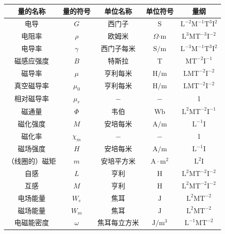 \begin{center}
\begin{tabular}{ccccc}
        \bottomrule
    \end{tabular}
        
    \newpage
    \begin{tabular}{ccccc}
        \toprule
        量的名称&量的符号&单位名称&单位符号&量纲\\
        \midrule
        电导&$G$&西门子&$\mathrm{S}$&$\mathrm{L^{-2}M^{-1}T^3I^2}$\\
        电阻率&$\rho$&欧姆米&$\Omega\mathrm{\cdot m}$&$\mathrm{L^3MT^{-3}I^{-2}}$\\
        电导率&$\gamma$&西门子每米&$\mathrm{S/m}$&$\mathrm{L^{-3}M^{-1}T^3I^2}$\\
        磁感应强度&$B$&特斯拉&$\mathrm{T}$&$\mathrm{MT^{-2}I^{-1}}$\\
        磁导率&$\mu$&亨利每米&$\mathrm{H/m}$&$\mathrm{LMT^{-2}I^{-2}}$\\
        真空磁导率&$\mu_0$&亨利每米&$\mathrm{H/m}$&$\mathrm{LMT^{-2}I^{-2}}$\\
        相对磁导率&$\mu_r$&$\mathrm{-}$&$\mathrm{-}$&1\\
        磁通量&$\Phi$&韦伯&$\mathrm{Wb}$&$\mathrm{L^2MT^{-2}I^{-1}}$\\
        磁化强度&$M$&安培每米&$\mathrm{A/m}$&$\mathrm{L^{-1}I}$\\
        磁化率&$\chi_m$&$\mathrm{-}$&$\mathrm{-}$&1\\
        磁场强度&$H$&安培每米&$\mathrm{A/m}$&$\mathrm{L^{-1}I}$\\
        （线圈的）磁矩&$m$&安培平方米&$\mathrm{A\cdot m^2}$&$\mathrm{L^2I}$\\
        自感&$L$&亨利&$\mathrm{H}$&$\mathrm{L^2MT^{-2}I^{-2}}$\\
        互感&$M$&亨利&$\mathrm{H}$&$\mathrm{L^2MT^{-2}I^{-2}}$\\
        电场能量&$W_e$&焦耳&$\mathrm{J}$&$\mathrm{L^2MT^{-2}}$\\
        磁场能量&$W_m$&焦耳&$\mathrm{J}$&$\mathrm{L^2MT^{-2}}$\\
        电磁能密度&$\omega$&焦耳每立方米&$\mathrm{J/m^3}$&$\mathrm{L^{-1}MT^{-2}}$\\
        \bottomrule
    \end{tabular}
\end{center}